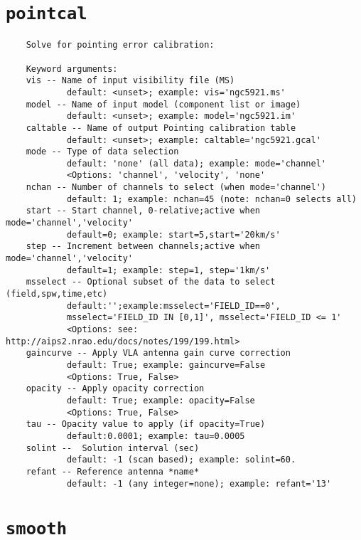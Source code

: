 \section{{\tt pointcal}}
\label{section:tasks.pointcal}

\small
\begin{verbatim}
    Solve for pointing error calibration:
    
    Keyword arguments:
    vis -- Name of input visibility file (MS)
            default: <unset>; example: vis='ngc5921.ms'
    model -- Name of input model (component list or image)
            default: <unset>; example: model='ngc5921.im'
    caltable -- Name of output Pointing calibration table
            default: <unset>; example: caltable='ngc5921.gcal'
    mode -- Type of data selection
            default: 'none' (all data); example: mode='channel'
            <Options: 'channel', 'velocity', 'none'
    nchan -- Number of channels to select (when mode='channel')
            default: 1; example: nchan=45 (note: nchan=0 selects all)
    start -- Start channel, 0-relative;active when mode='channel','velocity'
            default=0; example: start=5,start='20km/s'
    step -- Increment between channels;active when mode='channel','velocity'
            default=1; example: step=1, step='1km/s'
    msselect -- Optional subset of the data to select (field,spw,time,etc)
            default:'';example:msselect='FIELD_ID==0', 
            msselect='FIELD_ID IN [0,1]', msselect='FIELD_ID <= 1'
            <Options: see: http://aips2.nrao.edu/docs/notes/199/199.html>
    gaincurve -- Apply VLA antenna gain curve correction
            default: True; example: gaincurve=False
            <Options: True, False>
    opacity -- Apply opacity correction
            default: True; example: opacity=False
            <Options: True, False>
    tau -- Opacity value to apply (if opacity=True)
            default:0.0001; example: tau=0.0005
    solint --  Solution interval (sec)
            default: -1 (scan based); example: solint=60.
    refant -- Reference antenna *name*
            default: -1 (any integer=none); example: refant='13'
\end{verbatim}
\normalsize


\section{{\tt smooth}}
\label{section:tasks.smooth}

